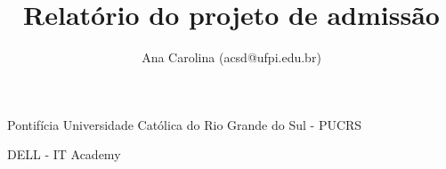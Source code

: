 \documentclass[a4paper,12pt,singlespacing]{article}
\title{Relatório do projeto de admissão}
\author{Ana Carolina (acsd@ufpi.edu.br)}
\begin{document}
    {\centering
        \setlength{\parskip}{0pt}
        Pontifícia Universidade Católica do Rio Grande do Sul - PUCRS
        
        \setlength{\parskip}{0pt}
        DELL - IT Academy

        \setlength{\parskip}{18pt}
        \textbf{ \thetitle }
        \setlength{\parskip}{12pt}
        
        \theauthor
        
        \setlength{\parskip}{6pt}
        
    }

    \justifying
    
    
    

%    
    

\end{document}
